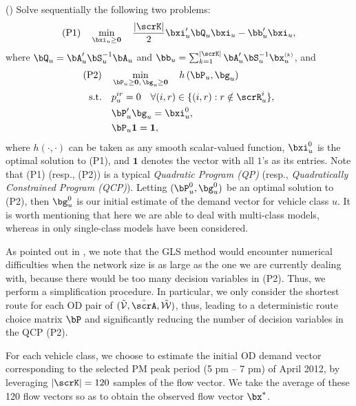 \documentclass[3p]{elsarticle}
\newcommand{\rmnum}[1]{\romannumeral #1}
\begin{document}
\begin{itemize}
	(\rmnum{2}) 
	Solve sequentially the following two problems:
	\begin{align}
	\text{(P1)} \quad \mathop {\min }\limits_{\bxi_u  \geq \textbf{0}} \quad \frac{|\scrK|}{2}\bxi_u '\bQ_u\bxi_u  - \bb_u'\bxi_u,   \label{qp2}
	\end{align}
	where $\bQ_u = \bA_u'{\bS_u^{ - 1}}\bA_u$ and $\bb_u =
	\sum\nolimits_{k = 1}^{|\scrK|} {\bA_u'{\bS_u^{ - 1}}{\bx_u^{\scriptscriptstyle{(k)}}}} $, and
	\begin{align}
	\text{(P2)} \quad &\mathop {\min }\limits_{\bP_u \geq \textbf{0}, \,\bg_u \geq \textbf{0} } \quad h\left( {\bP_u,\bg_u } \right) \label{qp3} \\
	\text{s.t.} \quad 
	& p_u^{ir} = 0 \quad \forall (i,r) \in \{(i,r): r \notin \scrR_u^i\}, \notag \\
	&\bP_u'\bg_u  = {\bxi_u ^0}, \notag \\
	&\bP_u\textbf{1} = \textbf{1}, \notag 
	\end{align}
	where $h(\cdot, \cdot)$ can be taken as any smooth scalar-valued function, $\bxi_u^0$ is the optimal solution to (P1), and $\textbf{1}$ denotes the vector with all $1$'s as its entries. Note that (P1) (resp., (P2)) is a typical \textit{Quadratic Program (QP)} (resp., \textit{Quadratically Constrained Program (QCP)}). Letting $(\bP_u^0, \bg_u^0)$ be an optimal solution to (P2), then $\bg_u^0$ is our initial estimate of the demand vector for vehicle class $u$.
	It is worth mentioning that here we are able to deal with multi-class models, whereas in \cite{CDC16,IFAC17,ieee18} only single-class models have been considered. 
	
	As pointed out in \cite{ieee18}, we note that the GLS method would encounter numerical difficulties when the network size is as large as the one we are currently dealing with, because there would be too many decision variables in (P2). Thus, we perform a simplification procedure. In particular, we only consider the shortest route for each OD pair of $( {\tilde{\mathcal{V}}, \tilde{\scrA}, \tilde{\mathcal{W}}} )$, thus, leading to a deterministic route choice matrix $\bP$ and significantly reducing the number of decision variables in the QCP (P2).
	
	For each vehicle class, we choose to estimate the initial OD demand vector corresponding to the selected PM peak period (5 pm -- 7 pm) of April 2012, by leveraging $|\scrK| = 120$ samples of the flow vector.  We take the average of these 120 flow vectors so as to obtain the observed flow vector $\bx^*$.
	
	

\end{itemize}
\end{document}
